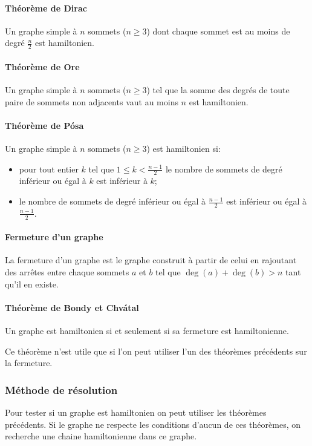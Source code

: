    \paragraph{Théorème de Dirac} Un graphe simple à $n$ sommets ($n \ge 3$)
    dont chaque sommet est au moins de degré $\frac{n}{2}$ est hamiltonien.

    \paragraph{Théorème de Ore} Un graphe simple à $n$ sommets ($n \ge 3$) tel
    que la somme des degrés de toute paire de sommets non adjacents vaut au
    moins $n$ est hamiltonien.

    \paragraph{Théorème de Pósa} Un graphe simple à $n$ sommets ($n \ge 3$) est
    hamiltonien si:
    \begin{itemize}
      \item pour tout entier $k$ tel que $1 \le k < \frac{n-1}{2}$ le nombre de
        sommets de degré inférieur ou égal à $k$ est inférieur à $k$;
      \item le nombre de sommets de degré inférieur ou égal à $\frac{n-1}{2}$
        est inférieur ou égal à $\frac{n-1}{2}$.
    \end{itemize}

    \paragraph{Fermeture d'un graphe} La fermeture d'un graphe est
    le graphe construit à partir de celui en rajoutant des arrêtes entre chaque
    sommets $a$ et $b$ tel que $\deg(a)+\deg(b) > n$ tant qu'il en existe.

    \paragraph{Théorème de Bondy et Chvátal} Un graphe est hamiltonien si et
    seulement si sa fermeture est hamiltonienne.

    Ce théorème n'est utile que si l'on peut utiliser l'un des théorèmes
    précédents sur la fermeture.

  \subsubsection{Méthode de résolution}
    Pour tester si un graphe est hamiltonien on peut utiliser les théorèmes
    précédents. Si le graphe ne respecte les conditions d'aucun de ces
    théorèmes, on recherche une chaine hamiltonienne dans ce graphe.

